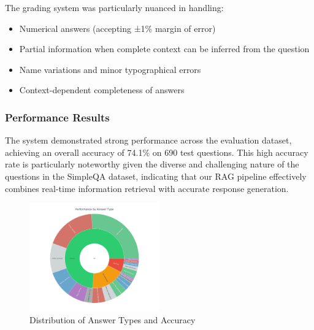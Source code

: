 \documentclass[fleqn,moreauthors,10pt]{ds_report}
\begin{document}
The grading system was particularly nuanced in handling:
\begin{itemize}[noitemsep]
    \item Numerical answers (accepting ±1\% margin of error)
    \item Partial information when complete context can be inferred from the question
    \item Name variations and minor typographical errors
    \item Context-dependent completeness of answers
\end{itemize}

\subsubsection*{Performance Results}
The system demonstrated strong performance across the evaluation dataset, achieving an overall accuracy of 74.1\% on 690 test questions. This high accuracy rate is particularly noteworthy given the diverse and challenging nature of the questions in the SimpleQA dataset, indicating that our RAG pipeline effectively combines real-time information retrieval with accurate response generation.
\begin{figure}[h]
\centering
\includegraphics[width=0.5\textwidth]{fig/distribution_answer_types.pdf}
\caption{Distribution of Answer Types and Accuracy}
\end{figure}
\newpage



\end{document}
